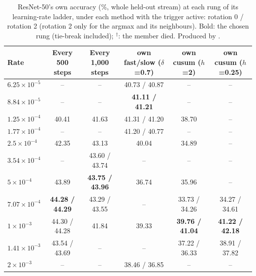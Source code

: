 \begin{table}[t]
  \centering\small
  \begin{tabular}{@{}lccccc@{}}
    \toprule
    Rate & Every 500 steps & Every 1,000 steps & own fast/slow ($\delta$=0.7) & own cusum ($h$=2) & own cusum ($h$=0.25) \\
    \midrule
    $6.25\!\times\!10^{-5}$ & -- & -- & 40.73 / 40.87 & -- & -- \\
    $8.84\!\times\!10^{-5}$ & -- & -- & \textbf{41.11 / 41.21} & -- & -- \\
    $1.25\!\times\!10^{-4}$ & 40.41 & 41.63 & 41.31 / 41.20 & 38.70 & -- \\
    $1.77\!\times\!10^{-4}$ & -- & -- & 41.20 / 40.77 & -- & -- \\
    $2.5\!\times\!10^{-4}$ & 42.35 & 43.13 & 40.04 & 34.89 & -- \\
    $3.54\!\times\!10^{-4}$ & -- & 43.60 / 43.74 & -- & -- & -- \\
    $5\!\times\!10^{-4}$ & 43.89 & \textbf{43.75 / 43.96} & 36.74 & 35.96 & -- \\
    $7.07\!\times\!10^{-4}$ & \textbf{44.28 / 44.29} & 43.29 / 43.55 & -- & 33.73 / 34.26 & 34.27 / 34.61 \\
    $1\!\times\!10^{-3}$ & 44.30 / 44.28 & 41.84 & 39.33 & \textbf{39.76 / 41.04} & \textbf{41.22 / 42.18} \\
    $1.41\!\times\!10^{-3}$ & 43.54 / 43.69 & -- & -- & 37.22 / 36.33 & 38.91 / 37.82 \\
    $2\!\times\!10^{-3}$ & -- & -- & 38.46 / 36.85 & -- & -- \\
    \bottomrule
  \end{tabular}
  \caption{ResNet-50's own accuracy (\%, whole held-out stream) at each rung of its learning-rate ladder, under each method with the trigger active: rotation 0 / rotation 2 (rotation 2 only for the argmax and its neighbours). Bold: the chosen rung (tie-break included); $^\dagger$: the member died. Produced by .}
  \label{tab:tune_rates_small}
\end{table}
